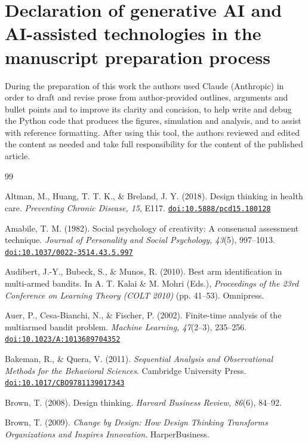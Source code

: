 \documentclass[preprint,review,11pt,authoryear]{elsarticle}
\providecommand{\doi}[1]{\href{https://doi.org/#1}{\nolinkurl{doi:#1}}}
\theoremstyle{definition}
\begin{document}
\section*{Declaration of generative AI and AI-assisted technologies in the manuscript preparation process}
During the preparation of this work the authors used Claude (Anthropic) in order to draft and revise prose from author-provided outlines, arguments and bullet points and to improve its clarity and concision, to help write and debug the Python code that produces the figures, simulation and analysis, and to assist with reference formatting. After using this tool, the authors reviewed and edited the content as needed and take full responsibility for the content of the published article.

\begin{thebibliography}{99}

 Altman, M., Huang, T. T. K., \& Breland, J. Y. (2018). Design thinking in health care. \textit{Preventing Chronic Disease, 15}, E117. \doi{10.5888/pcd15.180128}

 Amabile, T. M. (1982). Social psychology of creativity: A consensual assessment technique. \textit{Journal of Personality and Social Psychology, 43}(5), 997--1013. \doi{10.1037/0022-3514.43.5.997}

 Audibert, J.-Y., Bubeck, S., \& Munos, R. (2010). Best arm identification in multi-armed bandits. In A. T. Kalai \& M. Mohri (Eds.), \textit{Proceedings of the 23rd Conference on Learning Theory (COLT 2010)} (pp. 41--53). Omnipress.

 Auer, P., Cesa-Bianchi, N., \& Fischer, P. (2002). Finite-time analysis of the multiarmed bandit problem. \textit{Machine Learning, 47}(2--3), 235--256. \doi{10.1023/A:1013689704352}

 Bakeman, R., \& Quera, V. (2011). \textit{Sequential Analysis and Observational Methods for the Behavioral Sciences}. Cambridge University Press. \doi{10.1017/CBO9781139017343}

 Brown, T. (2008). Design thinking. \textit{Harvard Business Review, 86}(6), 84--92.

 Brown, T. (2009). \textit{Change by Design: How Design Thinking Transforms Organizations and Inspires Innovation}. HarperBusiness.


\end{thebibliography}
\end{document}
